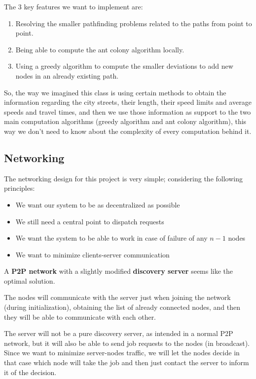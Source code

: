 \documentclass[titlepage]{article}
\begin{document}
The 3 key features we want to implement are:
\begin{enumerate}
    \item Resolving the smaller pathfinding problems related to the paths from point to point.
    \item Being able to compute the ant colony algorithm locally.
    \item Using a greedy algorithm to compute the smaller deviations to add new nodes in an already existing path.
\end{enumerate}

So, the way we imagined this class is using certain methods to obtain the information regarding the city streets, their length, their speed limits and average speeds and travel times, and then we use those information as support to the two main computation algorithms (greedy algorithm and ant colony algorithm), this way we don't need to know about the complexity of every computation behind it.

\subsection{Networking}
The networking design for this project is very simple; considering the following principles:
\begin{itemize}
    \item We want our system to be as decentralized as possible
    \item We still need a central point to dispatch requests
    \item We want the system to be able to work in case of failure of any $n-1$ nodes
    \item We want to minimize clients-server communication
\end{itemize}

A \textbf{P2P network} with a slightly modified \textbf{discovery server} seems like the optimal solution.

The nodes will communicate with the server just when joining the network (during initialization), obtaining the list of already connected nodes, and then they will be able to communicate with each other.

The server will not be a pure discovery server, as intended in a normal P2P network, but it will also be able to send job requests to the nodes (in broadcast). Since we want to minimize server-nodes traffic, we will let the nodes decide in that case which node will take the job and then just contact the server to inform it of the decision.
\end{document}
